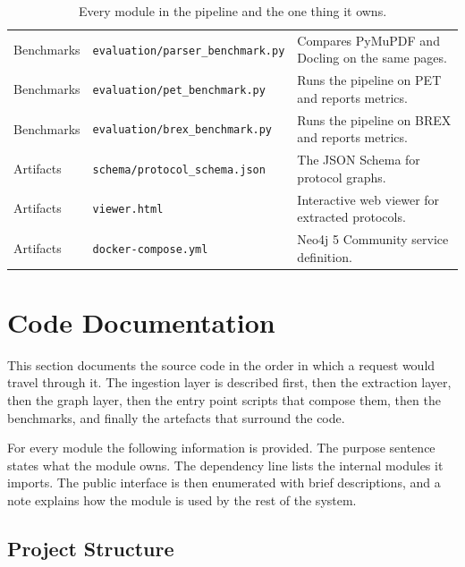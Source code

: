 \documentclass{article}
\begin{document}
\begin{table}[H]
\begin{tabularx}{\textwidth}{l l X}
\addlinespace
Benchmarks & \texttt{evaluation/parser\_benchmark.py} & Compares PyMuPDF and Docling on the same pages. \\
Benchmarks & \texttt{evaluation/pet\_benchmark.py}    & Runs the pipeline on PET and reports metrics. \\
Benchmarks & \texttt{evaluation/brex\_benchmark.py}   & Runs the pipeline on BREX and reports metrics. \\
\addlinespace
Artifacts  & \texttt{schema/protocol\_schema.json} & The JSON Schema for protocol graphs. \\
Artifacts  & \texttt{viewer.html}                  & Interactive web viewer for extracted protocols. \\
Artifacts  & \texttt{docker-compose.yml}           & Neo4j 5 Community service definition. \\
\bottomrule
\end{tabularx}
\caption{Every module in the pipeline and the one thing it owns.}
\label{tab:components}
\end{table}

\section{Code Documentation}
\label{sec:code-doc}

This section documents the source code in the order in which a request
would travel through it. The ingestion layer is described first, then
the extraction layer, then the graph layer, then the entry point
scripts that compose them, then the benchmarks, and finally the
artefacts that surround the code.

For every module the following information is provided. The purpose
sentence states what the module owns. The dependency line lists the
internal modules it imports. The public interface is then enumerated
with brief descriptions, and a note explains how the module is used by
the rest of the system.

\subsection{Project Structure}
\end{document}
